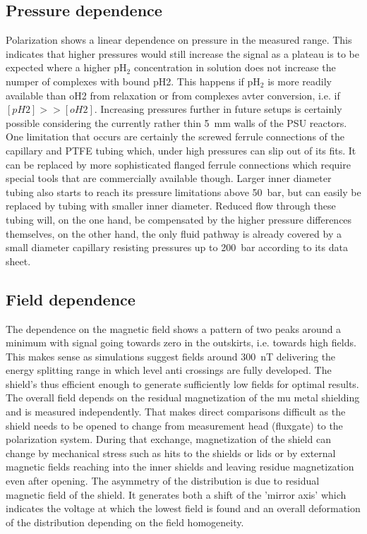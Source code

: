         \subsection{Pressure dependence}
        Polarization shows a linear dependence on pressure in the measured range. This indicates that higher pressures would still increase the signal as a plateau is to be expected where a higher pH$_2$ concentration in solution does not increase the numper of complexes with bound pH2. This happens if pH$_2$ is more readily available than oH2 from relaxation or from complexes avter conversion, i.e. if $[pH2]>>[oH2]$. Increasing pressures further in future setups is certainly possible considering the currently rather thin \SI{5}{\mm} walls of the PSU reactors. One limitation that occurs are certainly the screwed ferrule connections of the capillary and PTFE tubing which, under high pressures can slip out of its fits. It can be replaced by more sophisticated flanged ferrule connections which require special tools that are commercially available though. Larger inner diameter tubing also starts to reach its pressure limitations above \SI{50}{\bar}, but can easily be replaced by tubing with smaller inner diameter. Reduced flow through these tubing will, on the one hand, be compensated by the higher pressure differences themselves, on the other hand, the only fluid pathway is already covered by a small diameter capillary resisting pressures up to \SI{200}{\bar} according to its data sheet.
        \subsection{Field dependence}
        The dependence on the magnetic field shows a pattern of two peaks around a minimum with signal going towards zero in the outskirts, i.e. towards high fields. This makes sense as simulations suggest fields around \SI{300}{\nano\tesla} delivering the energy splitting range in which level anti crossings are fully developed. The shield's thus efficient enough to generate sufficiently low fields for optimal results. The overall field depends on the residual magnetization of the mu metal shielding and is measured independently. That makes direct comparisons difficult as the shield needs to be opened to change from measurement head (fluxgate) to the polarization system. During that exchange, magnetization of the shield can change by mechanical stress such as hits to the shields or lids or by external magnetic fields reaching into the inner shields and leaving residue magnetization even after opening. The asymmetry of the distribution is due to residual magnetic field of the shield. It generates both a shift of the 'mirror axis' which indicates the voltage at which the lowest field is found  and an overall deformation of the distribution depending on the field homogeneity.
